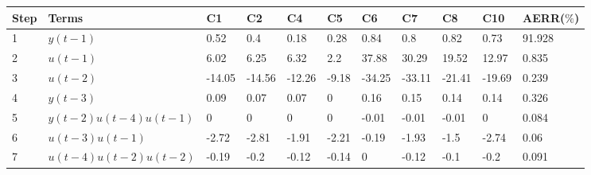 \begin{tabular}{lllllllllll}
Step & Terms & C1 & C2 & C4 & C5 & C6 & C7 & C8 & C10 & AERR($\%$) \\ 
\hline 
1 & $y(t-1)$ & 0.52 & 0.4 & 0.18 & 0.28 & 0.84 & 0.8 & 0.82 & 0.73 & 91.928 \\ 
2 & $u(t-1)$ & 6.02 & 6.25 & 6.32 & 2.2 & 37.88 & 30.29 & 19.52 & 12.97 & 0.835 \\ 
3 & $u(t-2)$ & -14.05 & -14.56 & -12.26 & -9.18 & -34.25 & -33.11 & -21.41 & -19.69 & 0.239 \\ 
4 & $y(t-3)$ & 0.09 & 0.07 & 0.07 & 0 & 0.16 & 0.15 & 0.14 & 0.14 & 0.326 \\ 
5 & $y(t-2)u(t-4)u(t-1)$ & 0 & 0 & 0 & 0 & -0.01 & -0.01 & -0.01 & 0 & 0.084 \\ 
6 & $u(t-3)u(t-1)$ & -2.72 & -2.81 & -1.91 & -2.21 & -0.19 & -1.93 & -1.5 & -2.74 & 0.06 \\ 
7 & $u(t-4)u(t-2)u(t-2)$ & -0.19 & -0.2 & -0.12 & -0.14 & 0 & -0.12 & -0.1 & -0.2 & 0.091 \\ 
\hline 
\end{tabular}